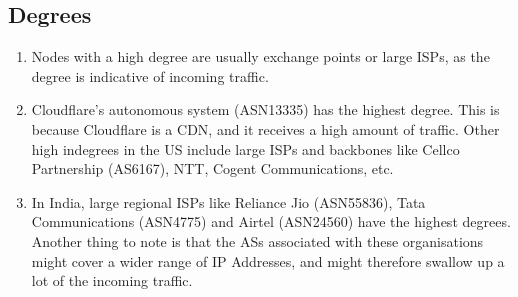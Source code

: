 \documentclass[a4paper, 11pt]{article}
\begin{document}
\subsection{Degrees}
    \begin{enumerate}
        \item Nodes with a high degree are usually exchange points or large ISPs, as the degree is indicative of incoming traffic.
        \item Cloudflare's autonomous system (ASN13335) has the highest degree. This is because Cloudflare is a CDN, and it receives a high amount of traffic. Other high indegrees in the US include large ISPs and backbones like Cellco Partnership (AS6167),
        NTT, Cogent Communications, etc.
        \item In India, large regional ISPs like Reliance Jio (ASN55836), Tata Communications (ASN4775) and Airtel (ASN24560) have the highest degrees. Another thing to note is that the ASs associated with
        these organisations might cover a wider range of IP Addresses, and might therefore swallow up a lot of the incoming traffic. 
    \end{enumerate}



\end{document}
